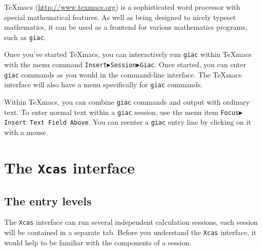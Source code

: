 \documentclass[a4paper,11pt]{book}
\begin{document}
TeXmacs (\url{http://www.texmacs.org}) is a sophisticated word
processor with special mathematical features.  As well as being
designed to nicely typeset mathematics, it can be used as a frontend
for various mathematics programs, such as \texttt{giac}.

Once you've started TeXmacs, you can interactively run \texttt{giac}
within TeXmacs with the menu command
\texttt{Insert$\blacktriangleright$Session$\blacktriangleright$Giac}.
Once started, you can enter \texttt{giac} commands as you would in the
command-line interface.  The TeXmacs interface will also have a menu
specifically for \texttt{giac} commands.

Within TeXmacs, you can combine \texttt{giac} commands and output with
ordinary text.  To enter normal text within a \texttt{giac} session,
use the menu item \texttt{Focus$\blacktriangleright$Insert Text Field
Above}.  You can reenter a \texttt{giac} entry line by clicking on it
with a mouse.



\chapter{The \texttt{Xcas} interface}

\section{The entry levels}

The \texttt{Xcas} interface can run several independent calculation
sessions, each session will be contained in a separate tab.  Before
you understand the \texttt{Xcas} interface, it would help to be
familiar with the components of a session.
\end{document}
